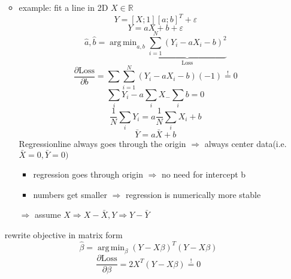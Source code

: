 \documentclass[11pt]{article}
\DeclareMathOperator*{\argmin}{arg\,min}
\begin{document}
\begin{itemize}
\begin{itemize}
\begin{equation*}
        \end{equation*}
        \item example: fit a line in 2D $X \in \mathbb{R}$
        \begin{equation*}
          Y = [X;1][a;b]^T + \varepsilon
        \end{equation*}
        \begin{equation*}
          Y = aX + b + \varepsilon
        \end{equation*}
        \begin{equation*}
          \hat{a}, \hat{b} = \argmin_{a,b} \underbrace{\sum_{i=1}^N (Y_i-aX_i-b)^2}_{
          \text{Loss}}
        \end{equation*}
        \begin{equation*}
          \frac{\partial \text{Loss}}{\partial b} = \sum \sum_{i=1}^N (Y_i-aX_i-b)
          (-1)\overset{!}{=}0
        \end{equation*}
        \begin{equation*}
          \sum_iY_i-a\sum_iX_-\sum_ib=0
        \end{equation*}
        \begin{equation*}
          \frac{1}{N}\sum_iY_i=a\frac{1}{N}\sum_iX_i+b
        \end{equation*}
        \begin{equation*}
          \bar{Y} = a\bar{X}+b
        \end{equation*}
        Regressionline always goes through the origin
        $\Rightarrow$ always center data(i.e. $\bar{X}=0, \bar{Y}=0)$
        \begin{itemize}
          \item regression goes through origin $\Rightarrow$ no need for
          intercept b
          \item numbers get smaller $\Rightarrow$ regression is numerically more stable
        \end{itemize}
        $\Rightarrow$ assume $X \Rightarrow X-\bar{X}, Y \Rightarrow Y-\bar{Y}$
      \end{itemize}
      rewrite objective in matrix form
      \begin{equation*}
        \hat{\beta} = \argmin_{\beta}(Y-X\beta)^T(Y-X\beta)
      \end{equation*}
      \begin{equation*}
        \frac{\partial \text{Loss}}{\partial \beta} = 2X^T(Y-X\beta) \overset{!}{=}0
      \end{equation*}
      \begin{equation*}

\end{equation*}
\end{itemize}
\end{document}
